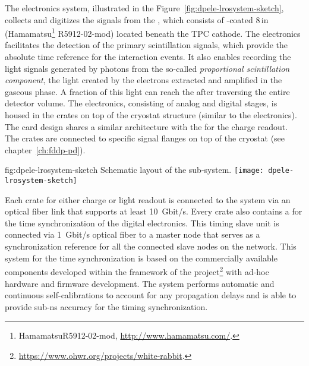 The  electronics system, illustrated in the Figure~\ref{fig:dpele-lrosystem-sketch},  collects and digitizes the signals from the , which consists of -coated \num{8}\,in  (Hamamatsu\footnote{Hamamatsu\texttrademark R5912-02-mod, \url{http://www.hamamatsu.com/}.} R5912-02-mod) located beneath the TPC cathode. The  electronics %
facilitates the detection of the primary scintillation signals, which provide the absolute time reference for the interaction events. It %
also enables recording the light signals generated by photons from the so-called \textit{proportional scintillation component}, the light created by the electrons extracted and amplified in the gaseous phase. A fraction of this light can reach the  after traversing the entire detector volume.  
The  electronics, consisting of analog and digital stages, is housed in the  crates on top of the cryostat structure (similar to the  electronics). The   card design shares a similar architecture with the  for the charge readout. The   crates are connected to specific  signal \fdth flanges on top of the cryostat (see chapter~\ref{ch:fddp-pd}).

\begin{dunefigure}{fig:dpele-lrosystem-sketch}
{Schematic layout of the   sub-system.}
\texttt{[image: dpele-lrosystem-sketch]}
\end{dunefigure}

Each  crate for either charge or light readout is connected to the  system via an optical fiber link that supports at least \SI{10}{Gbit/s}. 
Every crate also contains a %
 for the time synchronization of the digital electronics. This timing slave unit is connected via \SI{1}{Gbit/s} optical fiber to a master node that serves as a synchronization reference for all the connected slave nodes on the network. This system for the time synchronization is based on the commercially available components developed within the framework of the  project\footnote{\url{https://www.ohwr.org/projects/white-rabbit}.} with ad-hoc hardware and firmware development. The system performs automatic and continuous self-calibrations to account for any propagation delays and is able to provide sub-\si{\nano\s} accuracy for the timing synchronization.



